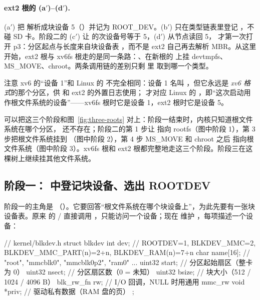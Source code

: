 \paragraph{ext2 根的 (a$'$)--(d$'$).} (a$'$) 把  解析成块设备 5（）并记为 ROOT\_DEV。(b$'$)  只在类型链表里登记 ，不碰 SD 卡。阶段二的 (c$'$) 让  的次设备号等于 5，(d$'$)  从节点读回 5， 才第一次打开 p3：分区起点与长度来自块设备表 ，而不是 ext2 自己再去解析 MBR。从这里开始，ext2 根与 xv6fs 根走的是同一条路：、在新根的  上挂 devtmpfs、MS\_MOVE、chroot。两条调用链的差别只剩  里  取到哪一个类型。

注意 xv6 的“设备 1”和 Linux 的  不完全相同：设备 1 名叫 ，但它永远是 \emph{xv6 格式}的那个分区，供  和 ext2 的外置日志使用； 才对应 Linux 的 ，即“这次启动用作根文件系统的设备”——xv6fs 根时它是设备 1，ext2 根时它是设备 5。

可以把这三个阶段和图~\ref{fig:three-roots} 对上：阶段一结束时，内核只知道根文件系统在哪个分区，\code{/} 还不存在；阶段二的第 1 步让 \code{/} 指向 rootfs（图中阶段 1），第 3 步把根文件系统挂到 （图中阶段 2），第 4 步 MS\_MOVE 和 chroot 之后 \code{/} 指向根文件系统（图中阶段 3）。xv6fs 根和 ext2 根都完整地走这三个阶段。阶段三在这棵树上继续挂其他文件系统。

\subsection{阶段一： 中登记块设备、选出 ROOTDEV}
\label{sec:ns-stage1}

阶段一的主角是 （）。它要回答“根文件系统在哪个块设备上”，为此先要有一张块设备表。原来  的 / 直接调用 ，只能访问一个设备；现在  维护 ，每项描述一个设备：

\begin{ccode}
// kernel/blkdev.h
struct blkdev {
  int      dev;      // ROOTDEV=1, BLKDEV_MMC=2, BLKDEV_MMC_PART(n)=2+n, BLKDEV_RAM(n)=7+n
  char     name[16]; // "root", "mmcblk0", "mmcblk0p2", "ram0" ...
  uint32   start;    // 分区起始扇区（整卡为 0）
  uint32   nsect;    // 分区扇区数（0 = 未知）
  uint32   bsize;    // 块大小（512 / 1024 / 4096 B）
  blk_rw_fn rw;      // I/O 回调，NULL 时用通用 mmc_rw
  void     *priv;    // 驱动私有数据（RAM 盘的页）
};
\end{ccode}

